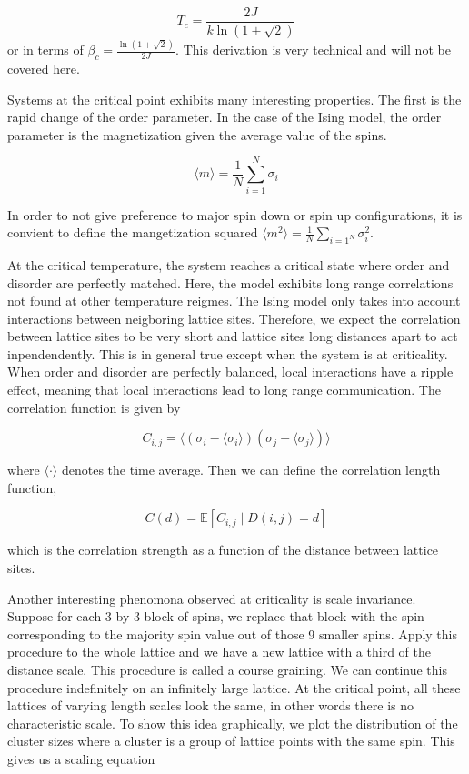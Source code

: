 \documentclass{article}
\begin{document}
\begin{equation} \label{eq:eq24}
    T_c = \frac{2J}{k \ln(1 + \sqrt2)}
\end{equation}
or in terms of $\beta_c = \frac{\ln(1 + \sqrt2)}{2J}$. This derivation is very technical and will not be covered here.




Systems at the critical point exhibits many interesting properties. The first is the rapid change of the order parameter.
In the case of the Ising model, the order parameter is the magnetization given the average value of the spins.

\begin{equation}
    \langle m \rangle = \frac1N \sum_{i=1}^N \sigma_i
\end{equation}

In order to not give preference to major spin down or spin up configurations, it is convient to define the mangetization squared
$\langle m^2 \rangle = \frac1N \sum_{i=1^N} \sigma_i^2$.

At the critical temperature, the system reaches a critical state where order and disorder are perfectly matched.
Here, the model exhibits long range correlations not found at other temperature reigmes. The Ising model only takes into account
interactions between neigboring lattice sites. Therefore, we expect the correlation between lattice sites to be very short and lattice sites
long distances apart to act inpendendently. This is in general true except when the system is at criticality. When order and disorder
are perfectly balanced, local interactions have a ripple effect, meaning that local interactions lead to long range communication. The correlation function is given by

\begin{equation}
    C_{i,j} = \langle (\sigma_i - \langle \sigma_i \rangle)(\sigma_j - \langle \sigma_j \rangle) \rangle
\end{equation}

where $\langle \cdot \rangle$ denotes the time average. Then we can define the correlation length function,

\begin{equation}
    C(d) = \mathbb{E} \left[ C_{i,j} \mid D(i,j) = d \right]
\end{equation}

which is the correlation strength as a function of the distance between lattice sites.

Another interesting phenomona observed at criticality is scale invariance. Suppose for each 3 by 3 block of spins, we replace that block
with the spin corresponding to the majority spin value out of those 9 smaller spins. Apply this procedure to the whole lattice and we have
a new lattice with a third of the distance scale. This procedure is called a course graining. We can continue this procedure indefinitely on an 
infinitely large lattice. At the critical point, all these lattices of varying length scales look the same, in other words there is no 
characteristic scale. To show this idea graphically, we plot the distribution of the cluster sizes where a cluster is a group of lattice points with
the same spin. This gives us a scaling equation 
\end{document}
